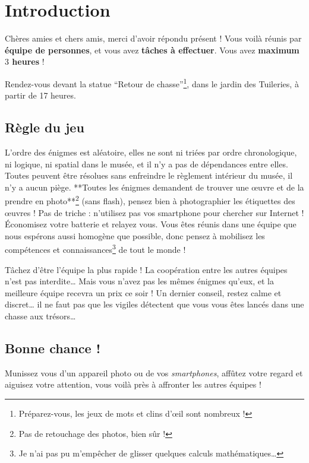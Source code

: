 \chapter{Introduction}

\vspace*{-30pt}

Chères amies et chers amis, merci d'avoir répondu présent !
%
Vous voilà réunis par \textbf{équipe de \nbparequipe{} personnes},
et vous avez \textbf{\nbenigmes{} tâches à effectuer}.
%
Vous avez \textbf{maximum $3$ heures} !

Rendez-vous devant la statue ``Retour de chasse''\footnote{Préparez-vous, les jeux de mots et clins d'œil sont nombreux !}, dans le jardin des Tuileries, à partir de 17 heures.


\section*{Règle du jeu}

L'ordre des énigmes est aléatoire, elles ne sont ni triées par ordre chronologique, ni logique, ni spatial dans le musée, et il n'y a pas de dépendances entre elles.
%
Toutes peuvent être résolues sans enfreindre le règlement intérieur du musée, il n'y a aucun piège.
**Toutes les énigmes demandent de trouver une œuvre et de la prendre en photo**\footnote{Pas de retouchage des photos, bien sûr !} (sans flash), pensez bien à photographier les étiquettes des œuvres !
Pas de triche : n'utilisez pas vos smartphone pour chercher sur Internet !
Économisez votre batterie et relayez vous.
%
Vous êtes réunis dans une équipe que nous espérons aussi homogène que possible, donc pensez à mobilisez les compétences et connaissances\footnote{Je n'ai pas pu m'empêcher de glisser quelques calculs mathématiques…} de tout le monde !

Tâchez d'être l'équipe la plus rapide ! La coopération entre les autres équipes n'est pas interdite…
Mais vous n'avez pas les mêmes énigmes qu'eux, et la meilleure équipe recevra un prix ce soir !
%
Un dernier conseil, restez calme et discret… il ne faut pas que les vigiles détectent que vous vous êtes lancés dans une chasse aux trésors…


\section*{Bonne chance !}
Munissez vous d'un appareil photo ou de vos \emph{smartphones}, affûtez votre regard et aiguisez votre attention, vous voilà près à affronter les autres équipes !
